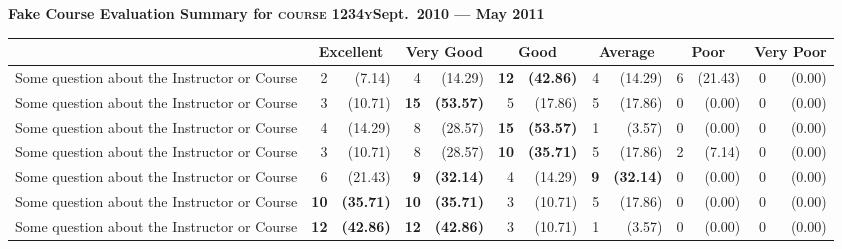 \documentclass[12pt, oneside, landscape]{memoir}
\newcommand{\myrowcolour}{\rowcolor[gray]{0.925}}
\newcommand{\cheading}[2]{\textbf{#1\hfill #2}}
\newcommand{\highest}[1]{\textbf{#1}}%
\newcommand{\cheading}[2]{\textcolor{Maroon}{\textbf{#1\hfill #2}}}
\newcommand{\highest}[1]{\textcolor{Maroon}{\textbf{#1}}}%
\begin{document}
\thispagestyle{empty}
\parindent0pt
%

\cheading{Fake Course Evaluation Summary for \textsc{course
    1234y}}{Sept.\ 2010 --- May 2011}

\begin{longtable}{@{}l rr rr rr rr rr rr}

\toprule%
 \centering%
 & \multicolumn{2}{c}{{{\bfseries Excellent}}}
 & \multicolumn{2}{c}{{{\bfseries Very Good}}}
 & \multicolumn{2}{c}{{{\bfseries Good}}}
 & \multicolumn{2}{c}{{{\bfseries Average}}}
 & \multicolumn{2}{c}{{{\bfseries Poor}}}
 & \multicolumn{2}{c}{{{\bfseries Very Poor}}} \\


\cmidrule[0.4pt](r{0.125em}){1-1}%
\cmidrule[0.4pt](lr{0.125em}){2-3}%
\cmidrule[0.4pt](lr{0.125em}){4-5}%
\cmidrule[0.4pt](lr{0.125em}){6-7}%
\cmidrule[0.4pt](lr{0.125em}){8-9}%
\cmidrule[0.4pt](lr{0.125em}){10-11}%
\cmidrule[0.4pt](l{0.25em}){12-13}%
\endhead


Some question about the Instructor or Course & 2 & (7.14) & 4 &
(14.29) & \highest{12} & \highest{(42.86)} & 4
& (14.29) & 6 & (21.43) & 0 & (0.00) \\

\myrowcolour%
Some question about the Instructor or Course & 3 & (10.71) &
\highest{15} & \highest{(53.57)} & 5 & (17.86) & 5 & (17.86) & 0 &
(0.00) & 0 & (0.00) \\

Some question about the Instructor or Course & 4 & (14.29) & 8 &
(28.57) & \highest{15}
& \highest{(53.57)} & 1 & (3.57) & 0 & (0.00) & 0 & (0.00) \\

\myrowcolour%
Some question about the Instructor or Course & 3 & (10.71) & 8 &
(28.57) & \highest{10} & \highest{(35.71)}
& 5 & (17.86) & 2 & (7.14) & 0 & (0.00) \\

Some question about the Instructor or Course & 6 & (21.43) &
\highest{9} & \highest{(32.14)}
& 4 & (14.29) & \highest{9} & \highest{(32.14)} & 0 & (0.00) & 0 & (0.00) \\

\myrowcolour%
Some question about the Instructor or Course & \highest{10} &
\highest{(35.71)} & \highest{10} & \highest{(35.71)}
& 3 & (10.71) & 5 & (17.86) & 0 & (0.00) & 0 & (0.00) \\

Some question about the Instructor or Course & \highest{12} &
\highest{(42.86)} & \highest{12} & \highest{(42.86)} & 3
& (10.71) & 1 & (3.57) & 0 & (0.00) & 0 & (0.00) \\


\end{longtable}
\end{document}
